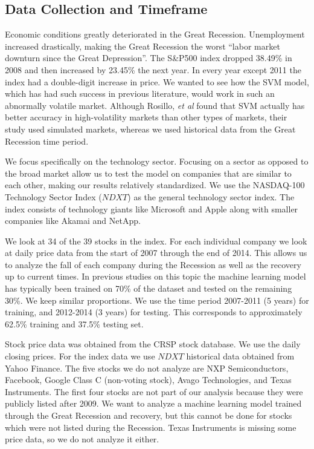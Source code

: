 \documentclass[pageno]{jpaper}
\begin{document}
\subsection{Data Collection and Timeframe}
\label{subsec: data}
Economic conditions greatly deteriorated in the Great Recession. Unemployment increased drastically, making the Great Recession the worst ``labor market downturn since the Great Depression''\cite{katz}. The S\&P500 index dropped 38.49\% in 2008 and then increased by 23.45\% the next year\cite{sp500returns}. In every year except 2011 the index had a double-digit increase in price. We wanted to see how the SVM model, which has had such success in previous literature, would work in such an abnormally volatile market. Although Rosillo, {\em et al} found that SVM actually has better accuracy in high-volatility markets than other types of markets, their study used simulated markets, whereas we used historical data from the Great Recession time period\cite{rosillo}.

We focus specifically on the technology sector. Focusing on a sector as opposed to the broad market allow us to test the model on companies that are similar to each other, making our results relatively standardized. We use the NASDAQ-100 Technology Sector Index ($NDXT$) as the general technology sector index. The index consists of technology giants like Microsoft and Apple along with smaller companies like Akamai and NetApp. 

We look at 34 of the 39 stocks in the index. For each individual company we look at daily price data from the start of 2007 through the end of 2014. This allows us to analyze the fall of each company during the Recession as well as the recovery up to current times. In previous studies on this topic the machine learning model has typically been trained on 70\% of the dataset and tested on the remaining 30\%. We keep similar proportions. We use the time period 2007-2011 (5 years) for training, and 2012-2014 (3 years) for testing. This corresponds to approximately 62.5\% training and 37.5\% testing set.

Stock price data was obtained from the CRSP stock database. We use the daily closing prices. For the index data we use $NDXT$ historical data obtained from Yahoo Finance. The five stocks we do not analyze are NXP Semiconductors, Facebook, Google Class C (non-voting stock), Avago Technologies, and Texas Instruments. The first four stocks are not part of our analysis because they were publicly listed after 2009. We want to analyze a machine learning model trained through the Great Recession and recovery, but this cannot be done for stocks which were not listed during the Recession. Texas Instruments is missing some price data, so we do not analyze it either.
\end{document}

